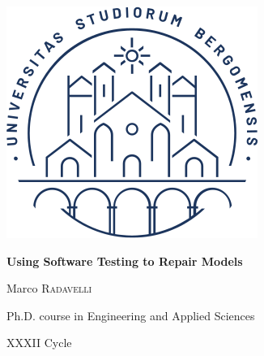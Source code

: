 \documentclass [a4paper, 12pt, twoside]{report}
\def \ttitle {Using Software Testing to Repair Models} %
\def \authorname{Marco \textsc{Radavelli}} %
\newcommand{\citlab}{\textsc{CitLab}\xspace}
\theoremstyle{plain}
\theoremstyle{definition}
\theoremstyle{remark}
\theoremstyle{plain}
\theoremstyle{plain}
\theoremstyle{remark}
\begin{document}
%




\begin{titlepage}
  \begin{center}
    \includegraphics[scale=0.5]{images/sigillo.png}
    
    \vspace{1cm}
    
    
    \vspace{1cm}
    
	{\huge \bfseries \ttitle\par}\vspace{0.4cm} %
	
    \vspace{1.5cm}
    
    {\huge \authorname}
    
    \vspace{.2cm}
    
    {\large Ph.D. course in Engineering and Applied Sciences}

	XXXII Cycle
    

\end{center}
\end{titlepage}
\end{document}
